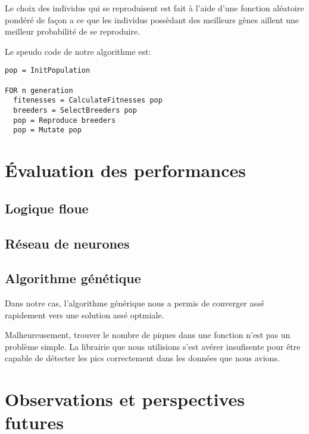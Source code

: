 \documentclass[12pt,letterpaper]{article}
\begin{document}
Le choix des individus qui se reproduisent est fait à l'aide d'une fonction aléatoire pondéré de façon a ce que les individus possèdant
des meilleurs gènes aillent une meilleur probabilité de se reproduire.

Le speudo code de notre algorithme est:

\begin{verbatim}
pop = InitPopulation

FOR n generation
  fitenesses = CalculateFitnesses pop
  breeders = SelectBreeders pop
  pop = Reproduce breeders
  pop = Mutate pop

\end{verbatim}


\section{Évaluation des performances}

\subsection{Logique floue}

\subsection{Réseau de neurones} %

\subsection{Algorithme génétique}

Dans notre cas, l'algorithme générique nous a permis de converger assé rapidement vers une solution assé optmiale.

Malheureusement, trouver le nombre de piques dans une fonction n'est pas un problème simple. La librairie que nous utilisions
s'est avérer insufisente pour être capable de détecter les pics correctement dans les données que nous avions.


\section{Observations et perspectives futures}
\end{document}
